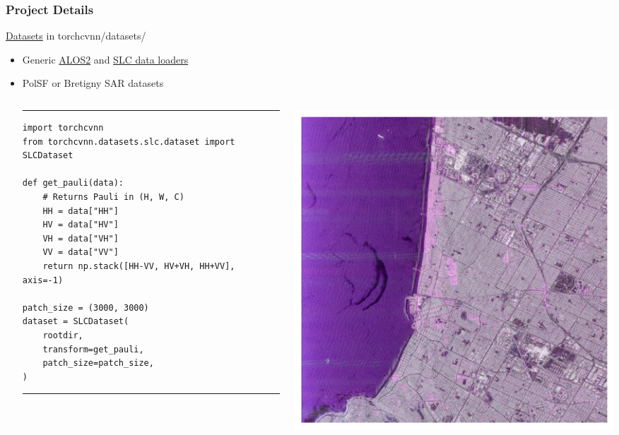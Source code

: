 \documentclass[aspectratio=169,10pt]{beamer}
\begin{document}
\begin{frame}[fragile]
\frametitle{Project Details}

\begin{block}{\href{https://jeremyfix.github.io/torchcvnn/reference/torchcvnn/datasets/}{Datasets} in torchcvnn/datasets/}

\begin{itemize}
    \item Generic \href{https://jeremyfix.github.io/torchcvnn/reference/torchcvnn/datasets/alos2/dataset/}{ALOS2} and \href{https://jeremyfix.github.io/torchcvnn/reference/torchcvnn/datasets/slc/dataset/}{SLC data loaders}
    \item PolSF or Bretigny SAR datasets
\begin{columns}[T] %
\begin{column}{.6\textwidth}    
\rule{\textwidth}{1pt}
\scriptsize
\begin{verbatim}
import torchcvnn
from torchcvnn.datasets.slc.dataset import SLCDataset

def get_pauli(data):
    # Returns Pauli in (H, W, C)
    HH = data["HH"]
    HV = data["HV"]
    VH = data["VH"]
    VV = data["VV"]
    return np.stack([HH-VV, HV+VH, HH+VV], axis=-1)
    
patch_size = (3000, 3000)
dataset = SLCDataset(
    rootdir,
    transform=get_pauli,
    patch_size=patch_size,
)
\end{verbatim}
\rule{\textwidth}{1pt}
\end{column}
\begin{column}{.3\textwidth}
\includegraphics[width=\columnwidth]{images/slc_SSurge_15305.png}
\end{column}
\end{columns}
\end{itemize}

\end{block}

\end{frame}
\end{document}
